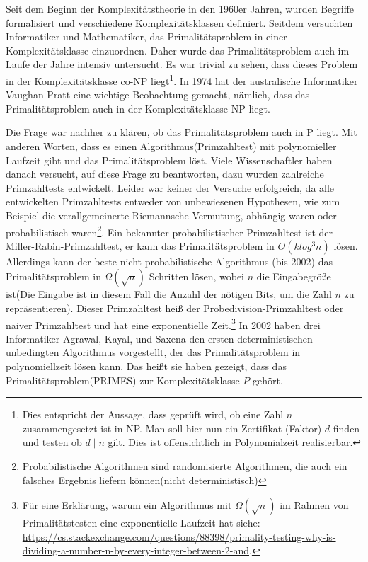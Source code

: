 \documentclass[12pt,oneside]{article}
\theoremstyle{remark}
\theoremstyle{definition}
\begin{document}
Seit dem Beginn der Komplexitätstheorie in den 1960er Jahren, wurden Begriffe formalisiert und verschiedene Komplexitätsklassen definiert\cite{com-theory}. Seitdem versuchten Informatiker und Mathematiker, das Primalitätsproblem in einer Komplexitätsklasse einzuordnen. Daher wurde das Primalitätsproblem auch im Laufe der Jahre intensiv untersucht. Es war trivial zu sehen, dass dieses Problem in der Komplexitätsklasse co-NP liegt\footnote{Dies entspricht der Aussage, dass geprüft wird, ob eine Zahl $n$ zusammengesetzt ist in NP. Man soll hier nun ein Zertifikat (Faktor) $d$ finden und testen ob $d \mid n$ gilt. Dies ist offensichtlich in Polynomialzeit realisierbar.}. In 1974 hat der australische Informatiker Vaughan Pratt eine wichtige Beobachtung gemacht, nämlich, dass das Primalitätsproblem auch in der Komplexitätsklasse NP liegt\cite{pratt}.

Die Frage war nachher zu klären, ob das Primalitätsproblem auch in P liegt. Mit anderen Worten, dass es einen Algorithmus(Primzahltest) mit polynomieller Laufzeit gibt und das Primalitätsproblem löst. Viele Wissenschaftler haben danach versucht, auf diese Frage zu beantworten, dazu wurden zahlreiche Primzahltests entwickelt. Leider war keiner der Versuche erfolgreich, da alle entwickelten Primzahltests entweder von unbewiesenen Hypothesen, wie zum Beispiel die verallgemeinerte Riemannsche Vermutung, abhängig waren oder probabilistisch waren\footnote{Probabilistische Algorithmen sind randomisierte Algorithmen, die auch ein falsches Ergebnis liefern können(nicht deterministisch)}. Ein bekannter probabilistischer Primzahltest ist der Miller-Rabin-Primzahltest, er kann das Primalitätsproblem in $O(k log^3 n)$ lösen\cite{milRab}. Allerdings kann der beste nicht probabilistische Algorithmus (bis 2002) das Primalitätsproblem in $ \Omega(\sqrt{n}) $ Schritten lösen, wobei $n$ die Eingabegröße ist(Die Eingabe ist in diesem Fall die Anzahl der nötigen Bits, um die Zahl $n$ zu repräsentieren). Dieser Primzahltest heiß der Probedivision-Primzahltest oder naiver Primzahltest und hat eine exponentielle Zeit.\footnote{Für eine Erklärung, warum ein Algorithmus mit $\Omega(\sqrt{n})$ im Rahmen von Primalitätstesten eine exponentielle Laufzeit hat siehe: \url{https://cs.stackexchange.com/questions/88398/primality-testing-why-is-dividing-a-number-n-by-every-integer-between-2-and}.} In 2002 haben drei Informatiker Agrawal, Kayal, und Saxena den ersten deterministischen unbedingten Algorithmus vorgestellt, der das Primalitätsproblem in polynomiellzeit lösen kann. Das heißt sie haben gezeigt, dass das Primalitätsproblem(PRIMES) zur Komplexitätsklasse $P$ gehört.      
\end{document}
